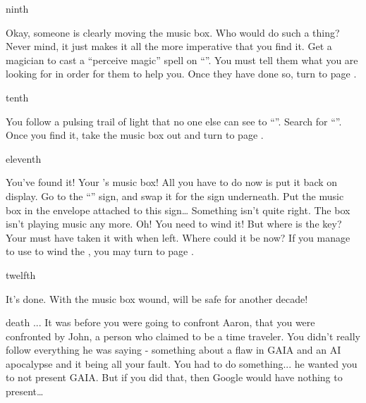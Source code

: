\documentclass[greennotebook]{NeptuneBall}
\begin{document}
\begin{page}{ninth}

Okay, someone is clearly moving the music box. Who would do such a thing? Never mind, it just makes it all the more imperative that you find it. Get a magician to cast a ``perceive magic'' spell on ``\sPacketC{}''. You must tell them what you are looking for in order for them to help you. Once they have done so, turn to page .

\end{page}

\begin{page}{tenth}

You follow a pulsing trail of light that no one else can see to ``\sDungeons{}''. Search for ``\sPacketD{}''. Once you find it, take the music box out and turn to page .

\end{page}

\begin{page}{eleventh}

You've found it! Your \cAthena{\parent}'s music box! All you have to do now is put it back on display. Go to the ``\sArtifactZero{}'' sign, and swap it for the sign underneath. Put the music box in the envelope attached to this sign\ldots{} Something isn't quite right. The box isn't playing music any more. Oh! You need to wind it! But where is the key? Your \cAthena{\parent} must have taken it with \cAthena{\them} when \cAthena{\they} left. Where could it be now? If you manage to use \iMusicBoxKey{} to wind the \iMusicBox{}, you may turn to page .

\end{page}

\begin{page}{twelfth}

It's done. With the music box wound, \pAtlantis{} will be safe for another decade!

\end{page}

\begin{page}{death}
... It was before you were going to confront Aaron, that you
were confronted by John, a person who claimed to be a time traveler. You didn't really follow everything he was saying - something about a flaw in GAIA and an AI apocalypse and it being all your fault. You had to do something... he wanted you to not present GAIA. But if you did that, then 
Google would have nothing to present\ldots{}
\end{page}
\end{document}

